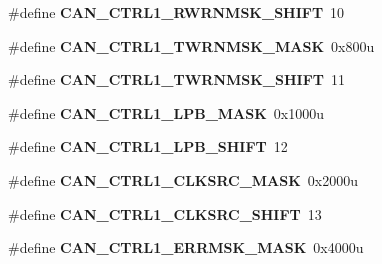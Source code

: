 \begin{DoxyCompactItemize}
\item 
\#define {\bfseries C\+A\+N\+\_\+\+C\+T\+R\+L1\+\_\+\+R\+W\+R\+N\+M\+S\+K\+\_\+\+S\+H\+I\+FT}~10\hypertarget{group__CAN__Register__Masks_gaaaa2935c6f8490bc19c7514f9a3eea5c}{}\label{group__CAN__Register__Masks_gaaaa2935c6f8490bc19c7514f9a3eea5c}

\item 
\#define {\bfseries C\+A\+N\+\_\+\+C\+T\+R\+L1\+\_\+\+T\+W\+R\+N\+M\+S\+K\+\_\+\+M\+A\+SK}~0x800u\hypertarget{group__CAN__Register__Masks_ga87f6ef900cc1d1a39b28eb8ac2a47493}{}\label{group__CAN__Register__Masks_ga87f6ef900cc1d1a39b28eb8ac2a47493}

\item 
\#define {\bfseries C\+A\+N\+\_\+\+C\+T\+R\+L1\+\_\+\+T\+W\+R\+N\+M\+S\+K\+\_\+\+S\+H\+I\+FT}~11\hypertarget{group__CAN__Register__Masks_gaf1bd84bad38306a14085dc57cb8728bf}{}\label{group__CAN__Register__Masks_gaf1bd84bad38306a14085dc57cb8728bf}

\item 
\#define {\bfseries C\+A\+N\+\_\+\+C\+T\+R\+L1\+\_\+\+L\+P\+B\+\_\+\+M\+A\+SK}~0x1000u\hypertarget{group__CAN__Register__Masks_ga6c3587074ec8b0646ec8c99f659bc90b}{}\label{group__CAN__Register__Masks_ga6c3587074ec8b0646ec8c99f659bc90b}

\item 
\#define {\bfseries C\+A\+N\+\_\+\+C\+T\+R\+L1\+\_\+\+L\+P\+B\+\_\+\+S\+H\+I\+FT}~12\hypertarget{group__CAN__Register__Masks_ga61cd46b497234d979cda54fa0952b848}{}\label{group__CAN__Register__Masks_ga61cd46b497234d979cda54fa0952b848}

\item 
\#define {\bfseries C\+A\+N\+\_\+\+C\+T\+R\+L1\+\_\+\+C\+L\+K\+S\+R\+C\+\_\+\+M\+A\+SK}~0x2000u\hypertarget{group__CAN__Register__Masks_ga24eac1a19c79f750c2ed88506155179d}{}\label{group__CAN__Register__Masks_ga24eac1a19c79f750c2ed88506155179d}

\item 
\#define {\bfseries C\+A\+N\+\_\+\+C\+T\+R\+L1\+\_\+\+C\+L\+K\+S\+R\+C\+\_\+\+S\+H\+I\+FT}~13\hypertarget{group__CAN__Register__Masks_gaba9b9a37df4f732cbd5b994aafe50eed}{}\label{group__CAN__Register__Masks_gaba9b9a37df4f732cbd5b994aafe50eed}

\item 
\#define {\bfseries C\+A\+N\+\_\+\+C\+T\+R\+L1\+\_\+\+E\+R\+R\+M\+S\+K\+\_\+\+M\+A\+SK}~0x4000u\hypertarget{group__CAN__Register__Masks_ga108c8ae37e8122ea29d48b9e68fbcc43}{}\label{group__CAN__Register__Masks_ga108c8ae37e8122ea29d48b9e68fbcc43}


\end{DoxyCompactItemize}
